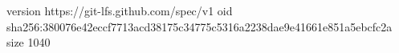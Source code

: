 version https://git-lfs.github.com/spec/v1
oid sha256:380076e42eccf7713acd38175c34775c5316a2238dae9e41661e851a5ebcfc2a
size 1040
